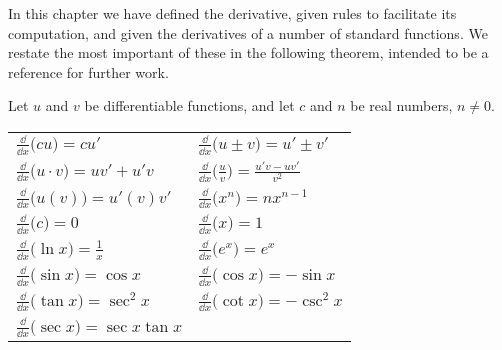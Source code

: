 

In this chapter we have defined the derivative, given rules to facilitate its computation, and given the derivatives of a number of standard functions. We restate the most important of these in the following theorem, intended to be a reference for further work.

\begin{theorem}\label{thm:deriv_glossary}
Let $u$ and $v$ be differentiable functions, and let $c$ and $n$ be real numbers, $n\neq 0$. \\
\begin{anywhereenum}
\renewcommand{\arraystretch}{1.6}
\begin{tabular}{ll}
	\item		$\frac{\dd}{\dd x}\bigl(cu\bigr) = cu'$ &
	\item		$\frac{\dd}{\dd x}\bigl(u\pm v\bigr) = u'\pm v'$ \\
	\item		$\frac{\dd}{\dd x}\bigl(u\cdot v\bigr) = uv'+u'v$ &
	\item		$\frac{\dd}{\dd x}\bigl(\frac uv\bigr) = \frac{u'v-uv'}{v^2}$ \\
	\item		$\frac{\dd}{\dd x}\bigl(u(v)\bigr) = u'(v)v'$ &
	\item		$\frac{\dd}{\dd x}\bigl(x^n\bigr) = nx^{n-1}$ \\
	\item		$\frac{\dd}{\dd x}\bigl(c\bigr) = 0$ &
	\item		$\frac{\dd}{\dd x}\bigl(x\bigr) = 1$ \\
	\item		$\frac{\dd}{\dd x}\bigl(\ln x\bigr) = \frac{1}{x}$ &
	\item		$\frac{\dd}{\dd x}\bigl(e^x\bigr) = e^x$ \\
	\item		$\frac{\dd}{\dd x}\bigl(\sin x\bigr) = \cos x$ &
	\item		$\frac{\dd}{\dd x}\bigl(\cos x\bigr) = -\sin x$ \\
	\item		$\frac{\dd}{\dd x}\bigl(\tan x\bigr) = \sec^2x$ &
	\item		$\frac{\dd}{\dd x}\bigl(\cot x\bigr) = -\csc^2x$ \\
	\item		$\frac{\dd}{\dd x}\bigl(\sec x\bigr) = \sec x\tan x$\qquad\null &

\end{tabular}
\end{anywhereenum}
\end{theorem}
